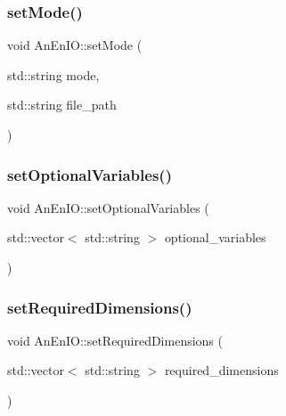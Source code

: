 \subsubsection{\texorpdfstring{set\+Mode()}{setMode()}\hspace{0.1cm}{\footnotesize\ttfamily [2/2]}}
{\footnotesize\ttfamily void An\+En\+I\+O\+::set\+Mode (\begin{DoxyParamCaption}\item[{std\+::string}]{mode,  }\item[{std\+::string}]{file\+\_\+path }\end{DoxyParamCaption})}

\mbox{\label{class_an_en_i_o_abc499df15eac5fa3f203267723f5edfa}} 
\subsubsection{\texorpdfstring{set\+Optional\+Variables()}{setOptionalVariables()}}
{\footnotesize\ttfamily void An\+En\+I\+O\+::set\+Optional\+Variables (\begin{DoxyParamCaption}\item[{std\+::vector$<$ std\+::string $>$}]{optional\+\_\+variables }\end{DoxyParamCaption})}

\mbox{\label{class_an_en_i_o_a239ea94b3648006920bcdcded4040ad3}} 
\subsubsection{\texorpdfstring{set\+Required\+Dimensions()}{setRequiredDimensions()}}
{\footnotesize\ttfamily void An\+En\+I\+O\+::set\+Required\+Dimensions (\begin{DoxyParamCaption}\item[{std\+::vector$<$ std\+::string $>$}]{required\+\_\+dimensions }\end{DoxyParamCaption})}

\mbox{\label{class_an_en_i_o_a643c51c346118d8416fa2c2e0da8042a}} 
